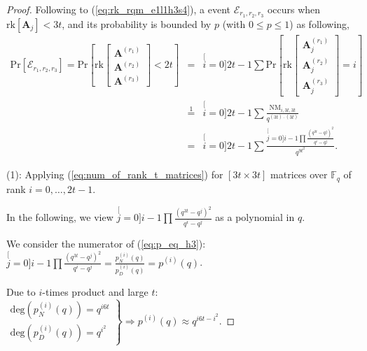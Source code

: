 \begin{proof}
Following to (\ref{eq:rk_rqm_e1l1h3s4}), a event $\mathcal{E}_{r_{1},r_{2},r_{3}}$
occurs when $\mathrm{rk}\left[\boldsymbol{A}_{j}\right]<3t$, and
its probability is bounded by $p$ (with $0\leq p\leq1$) as following,
\begin{eqnarray}
\mathrm{Pr}\left[\mathcal{E}_{r_{1},r_{2},r_{3}}\right]=\mathrm{Pr}\left[\mathrm{rk}\left[\begin{array}{c}
\boldsymbol{A}^{\left(r_{1}\right)}\\
\boldsymbol{A}^{\left(r_{2}\right)}\\
\boldsymbol{A}^{\left(r_{3}\right)}
\end{array}\right]<2t\right] & = & \stackrel[i=0]{2t-1}{\mathop{\sum}}\mathrm{Pr}\left[\mathrm{rk}\left[\begin{array}{c}
\boldsymbol{A}_{j}^{\left(r_{1}\right)}\\
\boldsymbol{A}_{j}^{\left(r_{2}\right)}\\
\boldsymbol{A}_{j}^{\left(r_{3}\right)}
\end{array}\right]=i\right]\label{eq:p_in_LLL}\\
 & \overset{1}{=} & \stackrel[i=0]{2t-1}{\mathop{\sum}}\frac{\mathrm{NM}_{i,3t,3t}}{q^{\left(3t\right)\cdot\left(3t\right)}}\nonumber \\
 & = & \stackrel[i=0]{2t-1}{\mathop{\sum}}\frac{\stackrel[j=0]{i-1}{\mathop{\prod}}\frac{\left(q^{3t}-q^{j}\right)^{2}}{q^{i}-q^{j}}}{q^{9t^{2}}}.\label{eq:p_eq_h3}
\end{eqnarray}

(1): Applying (\ref{eq:num_of_rank_t_matrices}) for $\left[3t\times3t\right]$
matrices over $\ensuremath{\mathbb{F}}_{q}$ of rank $i=0,\ldots,2t-1$.

In the following, we view $\stackrel[j=0]{i-1}{\mathop{\prod}}\frac{\left(q^{3t}-q^{j}\right)^{2}}{q^{i}-q^{j}}$
as a polynomial in $q$.

We consider the numerator of (\ref{eq:p_eq_h3}): $\stackrel[j=0]{i-1}{\mathop{\prod}}\frac{\left(q^{3t}-q^{j}\right)^{2}}{q^{i}-q^{j}}=\frac{p_{N}^{(i)}(q)}{p_{D}^{(i)}(q)}=p^{(i)}(q)$.

Due to $i$-times product and large $t$: $\left.\begin{array}{c}
\mathrm{deg}\left(p_{N}^{(i)}(q)\right)=q^{i6t}\\
\mathrm{deg}\left(p_{D}^{(i)}(q)\right)=q^{i^{2}}
\end{array}\right\} \Rightarrow p^{(i)}(q)\approx q^{i6t-i^{2}}$.


\end{proof}
